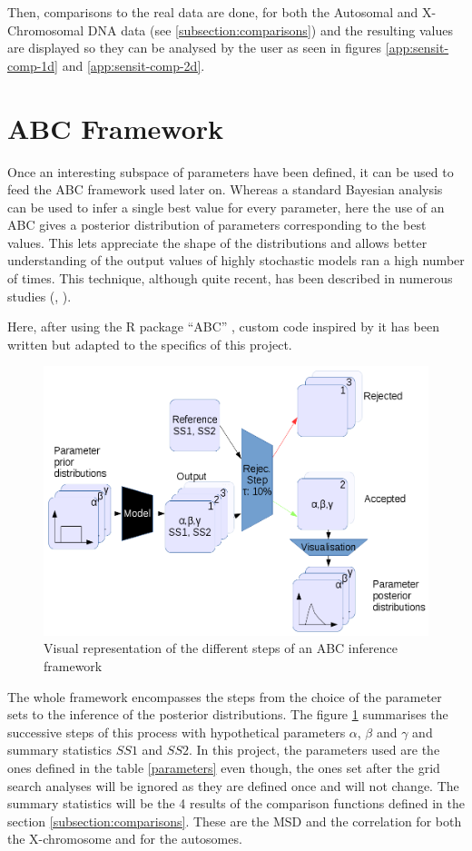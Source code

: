 \documentclass[a4paper,12pt]{report}
\begin{document}
Then, comparisons to the real data are done, for both the Autosomal and X-Chromosomal DNA data (see \ref{subsection:comparisons}) and the resulting values are displayed so they can be analysed by the user as seen in figures \ref{app:sensit-comp-1d} and \ref{app:sensit-comp-2d}.


\section{ABC Framework}
Once an interesting subspace of parameters have been defined, it can be used to feed the ABC framework used later on. Whereas a standard Bayesian analysis can be used to infer a single best value for every parameter, here the use of an ABC gives a posterior distribution of parameters corresponding to the best values. This lets appreciate the shape of the distributions and allows better understanding of the output values of highly stochastic models ran a high number of times. This technique, although quite recent, has been described in numerous studies (\cite{Sun01}, \cite{Csi02}).

Here, after using the R package “ABC” \cite{Csi01}, custom code inspired by it has been written but adapted to the specifics of this project.

\begin{figure}[!ht]
	\centering
	\includegraphics[width=1\textwidth]{../data/abc-landscape.png}
	\caption{Visual representation of the different steps of an ABC inference framework}
	\label{abc}
\end{figure}

The whole framework encompasses the steps from the choice of the parameter sets to the inference of the posterior distributions. The figure \ref{abc} summarises the successive steps of this process with hypothetical parameters $\alpha$, $\beta$ and $\gamma$ and summary statistics $SS1$ and $SS2$. In this project, the parameters used are the ones defined in the table \ref{parameters} even though, the ones set after the grid search analyses will be ignored as they are defined once and will not change. The summary statistics will be the 4 results of the comparison functions defined in the section \ref{subsection:comparisons}. These are the MSD and the correlation for both the X-chromosome and for the autosomes.
\end{document}
